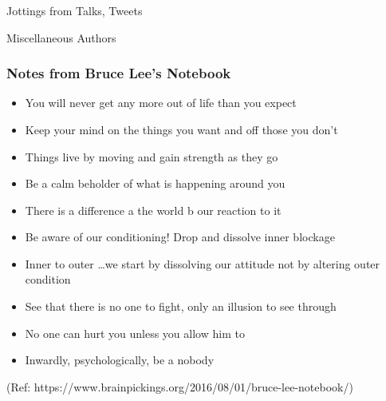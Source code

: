 \begin{frame}[fragile]\frametitle{}
\begin{center}
{\Large Jottings from Talks, Tweets}

{\small Miscellaneous Authors }


\end{center}
\end{frame}

\begin{frame}[fragile]\frametitle{ Notes from Bruce Lee's Notebook }

	\begin{itemize}
	\item You will never get any more out of life than you expect
	\item Keep your mind on the things you want and off those you don’t
	\item Things live by moving and gain strength as they go
	\item Be a calm beholder of what is happening around you
	\item There is a difference a the world b our reaction to it
	\item Be aware of our conditioning! Drop and dissolve inner blockage
	\item Inner to outer \ldots we start by dissolving our attitude not by altering outer condition
	\item See that there is no one to fight, only an illusion to see through
	\item No one can hurt you unless you allow him to
	\item Inwardly, psychologically, be a nobody
	\end{itemize}

{\tiny (Ref: https://www.brainpickings.org/2016/08/01/bruce-lee-notebook/)}

\end{frame}


